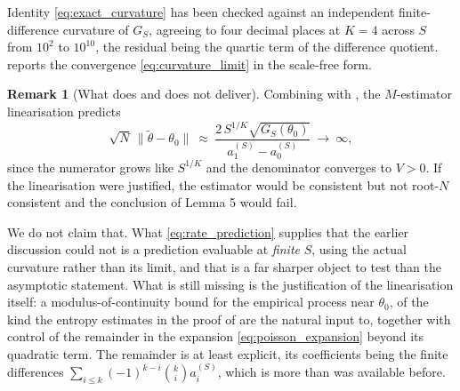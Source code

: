 \documentclass[11pt]{article}
\theoremstyle{definition}
\newtheorem{remark}[remark]{Remark}
\newcommand{\thetao}{\theta_0}
\begin{document}
Identity \eqref{eq:exact_curvature} has been checked against an independent finite-difference curvature of $G_S$, agreeing to four decimal places at $K=4$ across $S$ from $10^2$ to $10^{10}$, the residual being the quartic term of the difference quotient.  reports the convergence \eqref{eq:curvature_limit} in the scale-free form.

\begin{remark}[What  does and does not deliver]\label{rem:curvature_scope}
Combining  with , the $M$-estimator linearisation predicts
\begin{equation}\label{eq:rate_prediction}
\sqrt N\,\bigl\lVert\widetilde\theta-\thetao\bigr\rVert
\ \approx\
\frac{2\,S^{1/K}\sqrt{G_S(\thetao)}}{a_1^{(S)}-a_0^{(S)}}
\ \longrightarrow\ \infty ,
\end{equation}
since the numerator grows like $S^{1/K}$ and the denominator converges to $V>0$. If the linearisation were justified, the estimator would be consistent but not root-$N$ consistent and the conclusion of Lemma 5 would fail.

We do not claim that. What \eqref{eq:rate_prediction} supplies that the earlier discussion could not is a prediction evaluable at \emph{finite} $S$, using the actual curvature rather than its limit, and that is a far sharper object to test than the asymptotic statement. What is still missing is the justification of the linearisation itself: a modulus-of-continuity bound for the empirical process near $\thetao$, of the kind the entropy estimates in the proof of  are the natural input to, together with control of the remainder in the expansion \eqref{eq:poisson_expansion} beyond its quadratic term. The remainder is at least explicit, its coefficients being the finite differences $\sum_{i\le k}(-1)^{k-i}\binom kia_i^{(S)}$, which is more than was available before.
\end{remark}
\end{document}
